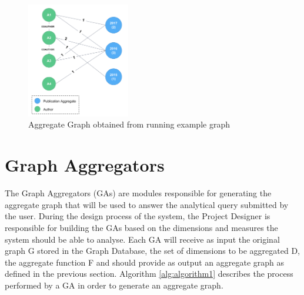 \begin{figure}[!h]
\centering
\includegraphics[width=0.4\textwidth]{../aggregate_graph_running_example.png}
\caption{Aggregate Graph obtained from running example graph}
\label{fig:figure28}
\end{figure}

\section{Graph Aggregators}

The Graph Aggregators (GAs) are modules responsible for generating the aggregate graph that will be used to answer the analytical query submitted by the user. During the design process of the system, the Project Designer is responsible for building the GAs based on the dimensions and measures the system should be able to analyse. Each GA will receive as input the original graph G stored in the Graph Database, the set of dimensions to be aggregated D, the aggregate function F and should provide as output an aggregate graph as defined in the previous section. Algorithm \ref{alg:algorithm1} describes the process performed by a GA in order to generate an aggregate graph.

